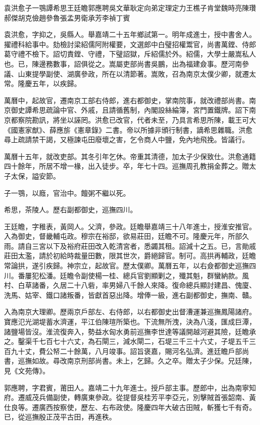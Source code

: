 
\begin{pinyinscope}
袁洪愈子一鶚譚希思王廷瞻郭應聘吳文華耿定向弟定理定力王樵子肯堂魏時亮陳瓚郝傑胡克儉趙參魯張孟男衛承芳李禎丁賓

袁洪愈，字抑之，吳縣人。舉嘉靖二十五年鄉試第一。明年成進士，授中書舍人。擢禮科給事中。劾檢討梁紹儒阿附權要，文選郎中白璧招權鬻官，尚書萬鏜、侍郎葛守禮不檢下。詔切責鏜、守禮，下璧詔獄，斥紹儒於外。紹儒，大學士嚴嵩私人也。已，陳邊務數事，詔俱從之。嵩屬吏部尚書吳鵬，出為福建僉事。歷河南參議、山東提學副使、湖廣參政，所在以清節著。嵩敗，召為南京太僕少卿，就遷太常。隆慶五年，以疾歸。

萬曆中，起故官，遷南京工部右侍郎，進右都御史，掌南院事，就改禮部尚書。南京御史譚希思疏論中官、外戚，且請循舊制，內閣設絲綸簿，宮門置鐵牌。詔下南京都察院勘訊，將坐以誣罔。洪愈已改官，代者未至，乃具言希思所陳，載王可大《國憲家猷》、薛應旂《憲章錄》二書。帝以所據非頒行制書，謫希思雜職。洪愈尋上疏請禁干謁，又極諫屯田廢壞之害，乞令商人中鹽，免內地飛挽。皆議行。

萬曆十五年，就改吏部。其冬引年乞休。帝重其清德，加太子少保致仕。洪愈通籍四十餘年，所居不增一椽，出入徒步。卒，年七十四。巡撫周孔教捐金葬之。贈太子太保，謚安節。

子一鶚，以廕，官治中。饘粥不繼以死。

希思，茶陵人。歷右副都御史，巡撫四川。

王廷瞻，字稚表，黃岡人。父濟，參政。廷瞻舉嘉靖三十八年進士，授淮安推官。入為御史，督畿輔屯政。穆宗在裕邸，欲易莊田，廷瞻不可。隆慶元年，所部久雨。請自三宮以下及裕府莊田改入乾清宮者，悉蠲其租。詔減十之五。已，言勛戚莊田太濫，請於初給時裁量田數，限其世次，爵絕歸官。制可。高拱再輔政，廷瞻常論拱，遂引疾歸。神宗立，起故官。歷太僕卿。萬曆五年，以右僉都御史巡撫四川。番屢犯松潘。廷瞻令副使楊一桂、總兵官劉顯剿之，殲其魁，群蠻納款。風村、白草諸番，久居二十八砦，率男婦八千餘人來降。復命總兵顯討建昌、傀廈、洗馬、姑宰、鐵口諸叛番，皆獻首惡出降。增俸一級，進右副都御史，撫南、贛。

入為南京大理卿。歷兩京戶部左、右侍郎，以右都御史出督漕運兼巡撫鳳陽諸府。寶應氾光湖堤蓄水濟運，平江伯陳瑄所築也。下流無所洩，決為八淺，匯成巨潭，諸鹽場皆沒。淮流復奔入，勢益水匈水勇前巡撫李世達等議開越河避其險，廷瞻承之。鑿渠千七百七十六丈，為石閘三，減水閘二，石堤三千三十六丈，子堤五千三百九十丈，費公帑二十餘萬，八月竣事。詔旨褒嘉，賜河名弘濟。進廷瞻戶部尚書，巡撫如故。尋改南京刑部尚書。未上，乞歸。久之卒。贈太子少保。兄廷陳，見《文苑傳》。

郭應聘，字君賓，莆田人。嘉靖二十九年進士。授戶部主事。歷郎中，出為南寧知府。遷威茂兵備副使，轉廣東參政。從提督吳桂芳平李亞元，別擊賊首張韶南、黃仕良等。遷廣西按察使，歷左、右布政使。隆慶四年大破古田賊，斬獲七千有奇。已，從巡撫殷正茂平古田，再進秩。


\end{pinyinscope}
